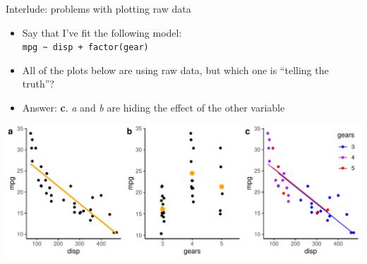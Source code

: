 \documentclass[
  ignorenonframetext,
  aspectratio=169]{beamer}
\providecommand{\tightlist}{%
  \setlength{\itemsep}{0pt}\setlength{\parskip}{0pt}}
\begin{document}
\begin{frame}[fragile]{Interlude: problems with plotting raw data}
\protect\hypertarget{interlude-problems-with-plotting-raw-data}{}
\begin{itemize}
\tightlist
\item
  Say that I've fit the following model:\\
  \texttt{mpg\ \textasciitilde{}\ disp\ +\ factor(gear)}
\item
  All of the plots below are using raw data, but which one is ``telling
  the truth''?
\item
  Answer: \textbf{c}. \emph{a} and \emph{b} are hiding the effect of the
  other variable
\end{itemize}

\includegraphics{03-Lecture_files/figure-beamer/unnamed-chunk-15-1.pdf}
\end{frame}
\end{document}
